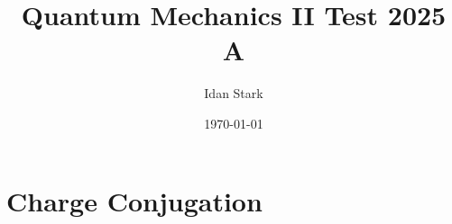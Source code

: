 \documentclass{article}
\title{Quantum Mechanics II Test 2025 A}
\author{Idan Stark}
\date{\today}
\begin{document}
\maketitle
\section{Charge Conjugation}
\end{document}
